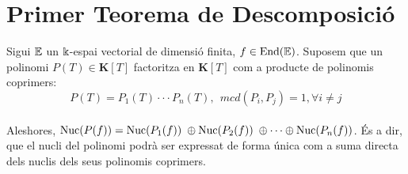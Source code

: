 \section{Primer Teorema de Descomposició}

Sigui $\mathbb{E}$ un $\Bbbk$-espai vectorial de dimensió finita, $f \in \text{End}(\mathbb{E})$. Suposem que un polinomi $P(T) \in \mathbf{K}[T]$ factoritza en $\mathbf{K}[T]$ com a producte de polinomis coprimers:
$$P(T) = P_1(T) \cdot\cdot\cdot P_n(T), \:\: mcd(P_i, P_j) = 1, \forall i \neq j$$\\
Aleshores, $\operatorname{Nuc}(P(f)) = \operatorname{Nuc}(P_1(f))\; \oplus \operatorname{Nuc}(P_2(f))\; \oplus \cdots \oplus \operatorname{Nuc}(P_n(f))$. És a dir, que el nucli del polinomi podrà ser expressat de forma única com a suma directa dels nuclis dels seus polinomis coprimers.
\\

